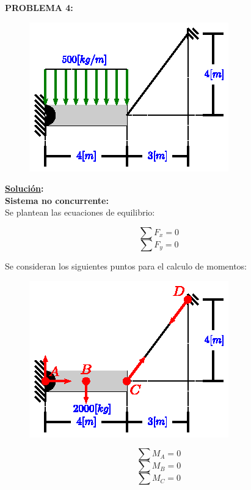 \documentclass[letter,10pt,twoside]{article}
\begin{document}
\vspace{1.0cm}

\colorbox{blue!25}{\textbf{PROBLEMA 4:}}

\begin{figure}[H]
\centering
\includegraphics[scale=1.8]{resources/f04.eps}
\end{figure}

\textbf{\underline{Solución}:} \\

\textbf{Sistema no concurrente:} \\
Se plantean las ecuaciones de equilibrio:

\begin{equation*}
    \sum{F_x} = 0
\end{equation*}
\begin{equation*}
    \sum{F_y} = 0
\end{equation*}

Se consideran los siguientes puntos para el calculo de momentos:

\begin{figure}[H]
\centering
\includegraphics[scale=1.8]{resources/g04.eps}
\end{figure}

\begin{equation*}
    \sum{M_A} = 0
\end{equation*}
\begin{equation*}
    \sum{M_B} = 0
\end{equation*}
\begin{equation*}
    \sum{M_C} = 0
\end{equation*}
\end{document}
